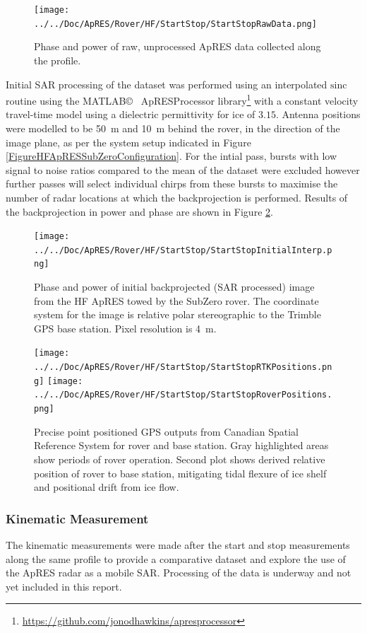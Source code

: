 \documentclass[a4paper,12pt]{article}
\begin{document}
\begin{figure}[h!]
  \centering 
  \texttt{[image: ../../Doc/ApRES/Rover/HF/StartStop/StartStopRawData.png]}
  \caption{Phase and power of raw, unprocessed ApRES data collected along the
  profile.}
  \label{FigureHFApRESRaw}
\end{figure}

Initial SAR processing of the dataset was performed using an interpolated 
$\textrm{sinc}$ routine using the MATLAB\copyright~ ApRESProcessor library\footnote{
\url{https://github.com/jonodhawkins/apresprocessor}} with a constant velocity
travel-time model using a dielectric permittivity for ice of $3.15$.  Antenna
positions were modelled to be \SI{50}{\metre} and \SI{10}{\metre} behind the
rover, in the direction of the image plane, as per the system setup indicated in
Figure \ref{FigureHFApRESSubZeroConfiguration}. For the
intial pass, bursts with low signal to noise ratios compared to the mean of the
dataset were excluded however further passes will select individual chirps from
these bursts to maximise the number of radar locations at which the
backprojection is performed.  Results of the backprojection in power and phase
are shown in Figure \ref{FigureHFApRESBackprojection}.

\begin{figure}[h]
  \centering 
  \texttt{[image: ../../Doc/ApRES/Rover/HF/StartStop/StartStopInitialInterp.png]}
  \caption{Phase and power of initial backprojected (SAR processed) image from
  the HF ApRES towed by the SubZero rover.  The coordinate system for the image
  is relative polar stereographic to the Trimble GPS base station.  Pixel
  resolution is \SI{4}{\metre}.}
  \label{FigureHFApRESBackprojection}
\end{figure}

\begin{figure}[h!]
  \centering 
  \texttt{[image: ../../Doc/ApRES/Rover/HF/StartStop/StartStopRTKPositions.png]}
  \texttt{[image: ../../Doc/ApRES/Rover/HF/StartStop/StartStopRoverPositions.png]}
  \caption{Precise point positioned GPS outputs from Canadian Spatial Reference
  System for rover and base station.  Gray highlighted areas show periods of rover
  operation.  Second plot shows derived relative position of rover to base 
  station, mitigating tidal flexure of ice shelf and positional drift from ice 
  flow.}
  \label{FigureHFApRESGNSS}
\end{figure}

\subsubsection{Kinematic Measurement}
The kinematic measurements were made after the start and stop measurements along
the same profile to provide a comparative dataset and explore the use of the
ApRES radar as a mobile SAR.  Processing of the data is underway and not yet
included in this report.
\end{document}
